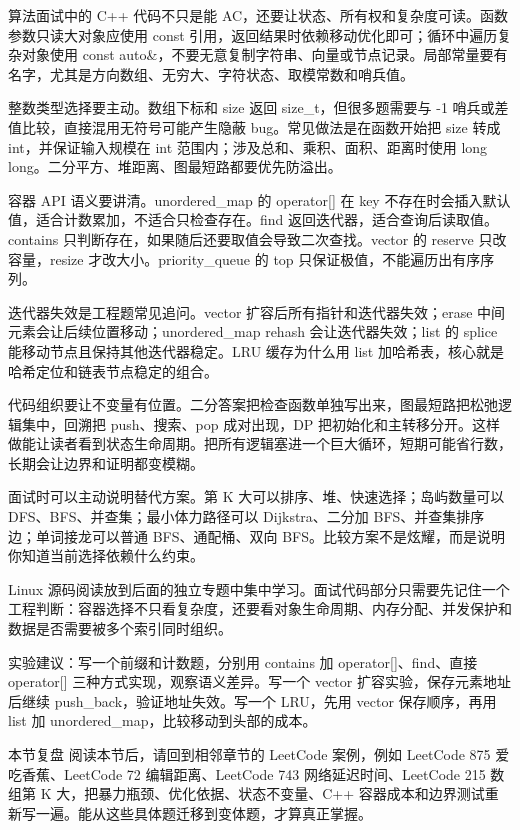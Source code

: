 
算法面试中的 C++ 代码不只是能 AC，还要让状态、所有权和复杂度可读。函数参数只读大对象应使用 const 引用，返回结果时依赖移动优化即可；循环中遍历复杂对象使用 const auto\&，不要无意复制字符串、向量或节点记录。局部常量要有名字，尤其是方向数组、无穷大、字符状态、取模常数和哨兵值。

整数类型选择要主动。数组下标和 size 返回 size\_t，但很多题需要与 -1 哨兵或差值比较，直接混用无符号可能产生隐蔽 bug。常见做法是在函数开始把 size 转成 int，并保证输入规模在 int 范围内；涉及总和、乘积、面积、距离时使用 long long。二分平方、堆距离、图最短路都要优先防溢出。

容器 API 语义要讲清。unordered\_map 的 operator[] 在 key 不存在时会插入默认值，适合计数累加，不适合只检查存在。find 返回迭代器，适合查询后读取值。contains 只判断存在，如果随后还要取值会导致二次查找。vector 的 reserve 只改容量，resize 才改大小。priority\_queue 的 top 只保证极值，不能遍历出有序序列。

迭代器失效是工程题常见追问。vector 扩容后所有指针和迭代器失效；erase 中间元素会让后续位置移动；unordered\_map rehash 会让迭代器失效；list 的 splice 能移动节点且保持其他迭代器稳定。LRU 缓存为什么用 list 加哈希表，核心就是哈希定位和链表节点稳定的组合。

代码组织要让不变量有位置。二分答案把检查函数单独写出来，图最短路把松弛逻辑集中，回溯把 push、搜索、pop 成对出现，DP 把初始化和主转移分开。这样做能让读者看到状态生命周期。把所有逻辑塞进一个巨大循环，短期可能省行数，长期会让边界和证明都变模糊。

面试时可以主动说明替代方案。第 K 大可以排序、堆、快速选择；岛屿数量可以 DFS、BFS、并查集；最小体力路径可以 Dijkstra、二分加 BFS、并查集排序边；单词接龙可以普通 BFS、通配桶、双向 BFS。比较方案不是炫耀，而是说明你知道当前选择依赖什么约束。

Linux 源码阅读放到后面的独立专题中集中学习。面试代码部分只需要先记住一个工程判断：容器选择不只看复杂度，还要看对象生命周期、内存分配、并发保护和数据是否需要被多个索引同时组织。

实验建议：写一个前缀和计数题，分别用 contains 加 operator[]、find、直接 operator[] 三种方式实现，观察语义差异。写一个 vector 扩容实验，保存元素地址后继续 push\_back，验证地址失效。写一个 LRU，先用 vector 保存顺序，再用 list 加 unordered\_map，比较移动到头部的成本。

\begin{principlebox}{本节复盘}
阅读本节后，请回到相邻章节的 LeetCode 案例，例如 LeetCode 875 爱吃香蕉、LeetCode 72 编辑距离、LeetCode 743 网络延迟时间、LeetCode 215 数组第 K 大，把暴力瓶颈、优化依据、状态不变量、C++ 容器成本和边界测试重新写一遍。能从这些具体题迁移到变体题，才算真正掌握。
\end{principlebox}
